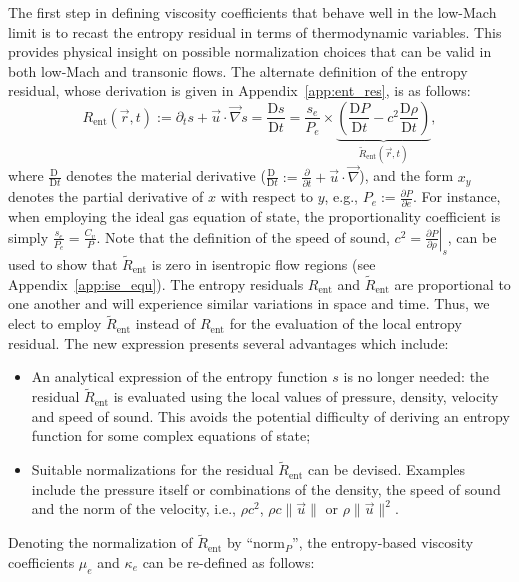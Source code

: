 \documentclass[review,10pt]{elsarticle}
\newcommand{\grad}{\vec{\nabla}}
\newcommand{\norm}{\textrm{norm}}
\newcommand{\resi}{R_\text{ent}}
\newcommand{\resinew}{\widetilde{R}_\text{ent}}
\newcommand{\matder}[1]{\frac{\textrm{D} #1}{\textrm{D} t}}
\newcommand{\app}[1]{Appendix~\ref{#1}}                   %
\begin{document}
The first step in defining viscosity coefficients that behave well in the low-Mach limit is to recast 
the entropy residual in terms of thermodynamic variables. This provides physical insight on possible 
normalization choices that can be valid in both low-Mach and transonic flows. The alternate definition 
of the entropy residual, whose derivation is given in \app{app:ent_res}, is as follows:
%
\begin{equation}
\label{eq:ent_res}
\resi(\vec{r},t) := \partial_t s + \vec{u} \cdot \grad s = \matder{s} = \frac{s_e}{P_e} \times \underbrace{ \left(\matder{P} - c^2 \matder{\rho} \right)}_{\resinew(\vec{r},t)} ,
\end{equation} 
%
where $\matder{\ }$ denotes the material derivative ($\matder{\ }:= \frac{\partial }{\partial t} + \vec{u} \cdot \grad $), and the form $x_y$ 
denotes the partial derivative of $x$ with respect to $y$, e.g., $P_e:=\frac{\partial P}{\partial e}$. 
%
For instance, when employing the ideal gas equation of state, the proportionality coefficient is simply $\frac{s_e}{P_e} = \frac{C_v}{P}$. Note that the definition of the speed of sound, $c^2 = \left. \frac{\partial P}{\partial \rho} \right|_s$, can be used to show that $\resinew$ is zero in isentropic flow regions (see \app{app:ise_equ}). The entropy residuals $\resi$ and $\resinew$ are proportional to one another and will experience similar 
variations in space and time. Thus, we elect to employ $\resinew$ instead of $\resi$ for the evaluation 
of the local entropy residual. The new expression presents several advantages which include:
%
\begin{itemize}
\item An analytical expression of the entropy function $s$ is no longer needed: the residual $\resinew$ is 
evaluated using the local values of pressure, density, velocity and speed of sound. This avoids the potential difficulty of deriving an entropy 
function for some complex equations of state;
\item Suitable normalizations for the residual $\resinew$ can be devised. Examples include the pressure 
itself or combinations of the density, the speed of sound and the norm of the velocity, 
i.e., $\rho c^2$, $\rho c \| \vec{u} \|$ or $\rho \| \vec{u} \|^2$. 
\end{itemize}
%
Denoting the normalization of $\resinew$ by ``$\norm_P$'', the entropy-based viscosity coefficients $\mu_e$ 
and $\kappa_e$ can be re-defined as follows:
%
\end{document}

